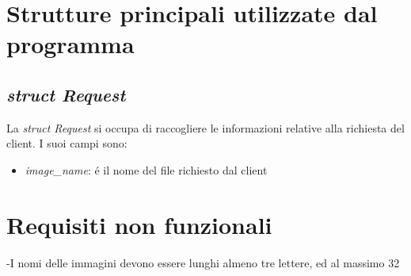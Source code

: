 \documentclass[a4paper, titlepage]{article}
\begin{document}
	\section{Strutture principali utilizzate dal programma}
	\subsection{\textit{struct Request}}
	\begin{flushleft}
		La \textit{struct Request} si occupa di raccogliere le informazioni relative alla richiesta del client. I suoi campi sono:
		\begin{itemize}
			\item \textit{image\_name}: \'{e} il nome del file richiesto dal client
		\end{itemize}
	\end{flushleft}
	
	\section{Requisiti non funzionali}
	\begin{flushleft}
		-I nomi delle immagini devono essere lunghi almeno tre lettere, ed al massimo 32
	\end{flushleft}
	
\end{document}
